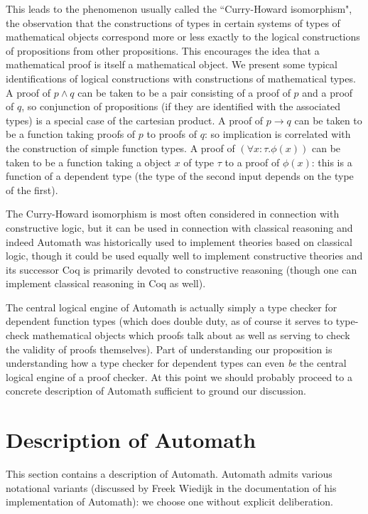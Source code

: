 \documentclass[12pt]{article}
\begin{document}
This leads to the phenomenon usually called the ``Curry-Howard isomorphism", the observation that the constructions of types in certain systems of types of mathematical objects
correspond more or less exactly to the logical constructions of propositions from other propositions.  This encourages the idea that a mathematical proof is itself a mathematical object.
We present some typical identifications of logical constructions with constructions of mathematical types.  A proof of $p \wedge q$ can be taken to be a pair consisting of a proof of $p$ and a proof
of $q$, so conjunction of propositions (if they are identified with the associated types)  is a special case of the cartesian product.   A proof of $p \rightarrow q$ can be taken to be a function taking
proofs of $p$ to proofs of $q$:  so implication is correlated with the construction of simple function types.  A proof of $(\forall x:\tau.\phi(x))$ can be taken to be a function taking a object
$x$ of type $\tau$ to a proof of $\phi(x)$:  this is a function of a dependent type (the type of the second input depends on the type of the first).

The Curry-Howard isomorphism is most often considered in connection with constructive logic, but it can be used in connection with classical reasoning and indeed Automath was historically used to implement theories based on classical logic, though it could be used equally well to implement constructive theories and its successor Coq is primarily devoted to constructive reasoning (though one can implement classical reasoning in Coq as well).

The central logical engine of Automath is actually simply a type checker for dependent function types (which does double duty, as of course it serves to type-check mathematical objects which proofs talk about as well as serving to check the validity of proofs themselves).   Part of understanding our proposition is understanding how a type checker for dependent types can even {\em be\/} the central logical engine of a proof checker.  At this point we should probably proceed to a concrete description of Automath sufficient to ground our discussion.

\newpage

\section{Description of Automath}

This section contains a description of Automath.  Automath admits various notational variants (discussed by Freek Wiedijk in the documentation of his implementation of Automath):  we choose one without explicit deliberation.
\end{document}

